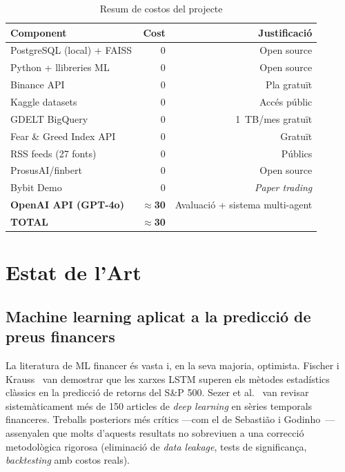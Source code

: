 \documentclass[12pt, a4paper]{report}
\begin{document}
\begin{table}[H]
\centering
\caption{Resum de costos del projecte}
\label{tab:pressupost}
\begin{tabular}{@{}lrr@{}}
\toprule
\textbf{Component} & \textbf{Cost} & \textbf{Justificació} \\
\midrule
PostgreSQL (local) + FAISS    & 0\texteuro{} & Open source \\
Python + llibreries ML        & 0\texteuro{} & Open source \\
Binance API                   & 0\texteuro{} & Pla gratuït \\
Kaggle datasets               & 0\texteuro{} & Accés públic \\
GDELT BigQuery                & 0\texteuro{} & 1~TB/mes gratuït \\
Fear \& Greed Index API       & 0\texteuro{} & Gratuït \\
RSS feeds (27 fonts)          & 0\texteuro{} & Públics \\
ProsusAI/finbert              & 0\texteuro{} & Open source \\
Bybit Demo                    & 0\texteuro{} & \textit{Paper trading} \\
\textbf{OpenAI API (GPT-4o)} & \textbf{$\approx$30\texteuro{}} & Avaluació + sistema multi-agent \\
\midrule
\textbf{TOTAL} & \textbf{$\approx$30\texteuro{}} & \\
\bottomrule
\end{tabular}
\end{table}


\chapter{Estat de l'Art}

\section{Machine learning aplicat a la predicció de preus financers}

La literatura de ML financer és vasta i, en la seva majoria, optimista. Fischer i Krauss~\cite{fischer2018} van demostrar que les xarxes LSTM superen els mètodes estadístics clàssics en la predicció de retorns del S\&P 500. Sezer et al.~\cite{sezer2020} van revisar sistemàticament més de 150 articles de \textit{deep learning} en sèries temporals financeres. Treballs posteriors més crítics ---com el de Sebastião i Godinho~\cite{sebastiao2021}--- assenyalen que molts d'aquests resultats no sobreviuen a una correcció metodològica rigorosa (eliminació de \textit{data leakage}, tests de significança, \textit{backtesting} amb costos reals).
\end{document}
